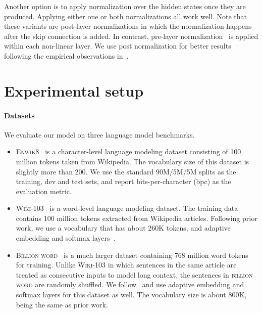 \documentclass[11pt,a4paper]{article}
\begin{document}
Another option is to apply normalization over the hidden states  once they are produced.
Applying either one or both normalizations all work well. 
Note that these variants are post-layer normalizations in which the normalization happens after the skip connection is added.
In contrast, pre-layer normalization~\cite{pmlr-v119-xiong20b} is applied within each non-linear layer.
We use post normalization for better results following the empirical observations in~\citet{liu-etal-2020-understanding}.
%
 
\section{Experimental setup}
\label{sec:setup}

\paragraph{Datasets}
We evaluate our model on three language model benchmarks.
\begin{itemize}
    \item \textsc{Enwik8}~\cite{hutter2012human} is a character-level language modeling dataset consisting of 100 million tokens taken from Wikipedia. 
    The vocabulary size of this dataset is slightly more than 200.
    We use the standard 90M/5M/5M splits as the training, dev and test sets, and report bits-per-character (bpc) as the evaluation metric.
\item \textsc{Wiki-103}~\cite{merity2016pointer} is a word-level language modeling dataset. The training data contains 100 million tokens extracted from Wikipedia articles. 
    Following prior work, we use a vocabulary that has about 260K tokens, and adaptive embedding and softmax layers~\cite{grave2017efficient,baevski2018adaptive}.
\item \textsc{Billion word}~\cite{billionword} is a much larger dataset containing 768 million word tokens for training.
    Unlike \textsc{Wiki-103} in which sentences in the same article are treated as consecutive inputs to model long context, the sentences in \textsc{billion word} are randomly shuffled.
    We follow~\citep{baevski2018adaptive} and use adaptive embedding and softmax layers for this dataset as well. 
    The vocabulary size is about 800K, being the same as prior work.
\end{itemize}
\end{document}
